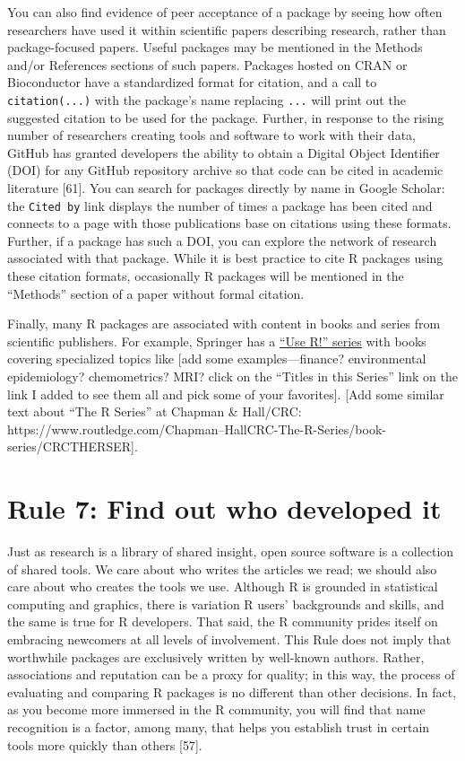 \documentclass[10pt,letterpaper]{article}
\begin{document}
You can also find evidence of peer acceptance of a package by seeing how
often researchers have used it within scientific papers describing
research, rather than package-focused papers. Useful packages may be
mentioned in the Methods and/or References sections of such papers.
Packages hosted on CRAN or Bioconductor have a standardized format for
citation, and a call to \texttt{citation(...)} with the package's name
replacing \texttt{...} will print out the suggested citation to be used
for the package. Further, in response to the rising number of
researchers creating tools and software to work with their data, GitHub
has granted developers the ability to obtain a Digital Object Identifier
(DOI) for any GitHub repository archive so that code can be cited in
academic literature {[}61{]}. You can search for packages directly by
name in Google Scholar: the \texttt{Cited\ by} link displays the number
of times a package has been cited and connects to a page with those
publications base on citations using these formats. Further, if a
package has such a DOI, you can explore the network of research
associated with that package. While it is best practice to cite R
packages using these citation formats, occasionally R packages will be
mentioned in the ``Methods'' section of a paper without formal citation.

Finally, many R packages are associated with content in books and series
from scientific publishers. For example, Springer has a
\href{https://www.springer.com/series/6991}{``Use R!'' series} with
books covering specialized topics like {[}add some examples---finance?
environmental epidemiology? chemometrics? MRI? click on the ``Titles in
this Series'' link on the link I added to see them all and pick some of
your favorites{]}. {[}Add some similar text about ``The R Series'' at
Chapman \& Hall/CRC:
https://www.routledge.com/Chapman--HallCRC-The-R-Series/book-series/CRCTHERSER{]}.

\hypertarget{rule-7-find-out-who-developed-it}{%
\section{Rule 7: Find out who developed
it}\label{rule-7-find-out-who-developed-it}}

Just as research is a library of shared insight, open source software is
a collection of shared tools. We care about who writes the articles we
read; we should also care about who creates the tools we use. Although R
is grounded in statistical computing and graphics, there is variation R
users' backgrounds and skills, and the same is true for R developers.
That said, the R community prides itself on embracing newcomers at all
levels of involvement. This Rule does not imply that worthwhile packages
are exclusively written by well-known authors. Rather, associations and
reputation can be a proxy for quality; in this way, the process of
evaluating and comparing R packages is no different than other
decisions. In fact, as you become more immersed in the R community, you
will find that name recognition is a factor, among many, that helps you
establish trust in certain tools more quickly than others {[}57{]}.
\end{document}
